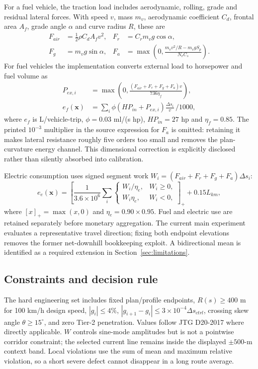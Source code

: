 \documentclass[preprint,12pt]{elsarticle}
\begin{document}
For a fuel vehicle, the traction load includes aerodynamic, rolling, grade and residual lateral forces. With speed $v$, mass $m_v$, aerodynamic coefficient $C_d$, frontal area $A_f$, grade angle $\alpha$ and curve radius $R$, these are
\begin{align}
F_{air}&=\tfrac12\rho C_d A_fv^2, & F_r&=C_rm_vg\cos\alpha,\\
F_g&=m_vg\sin\alpha, &
F_a&=\max\left(0,\frac{m_vv^2/R-m_vgS_p}{N_vC_s}\right).
\end{align}
For fuel vehicles the implementation converts external load to horsepower and fuel volume as
\begin{align}
P_{ex,i}&=\max\left(0,\frac{(F_{air}+F_r+F_g+F_a)v}{736\eta_f}\right),\\
e_f(\bm x)&=\sum_i \phi(HP_{in}+P_{ex,i})\frac{\Delta s_i}{v}\,/1000,
\label{eq:fuel}
\end{align}
where $e_f$ is L/vehicle-trip, $\phi=0.03$ ml/(s hp), $HP_{in}=27$ hp and $\eta_f=0.85$. The printed $10^{-3}$ multiplier in the source expression for $F_a$ is omitted: retaining it makes lateral resistance roughly five orders too small and removes the plan-curvature energy channel. This dimensional correction is explicitly disclosed rather than silently absorbed into calibration.

Electric consumption uses signed segment work $W_i=(F_{air}+F_r+F_g+F_a)\Delta s_i$:
\begin{equation}
e_e(\bm x)=\left[\frac{1}{3.6\times10^6}\sum_i
\begin{cases}W_i/\eta_e,&W_i\geq0,\\W_i\eta_e,&W_i<0,\end{cases}
\right]_+ +0.15L_{km},
\label{eq:ev}
\end{equation}
where $[x]_+=\max(x,0)$ and $\eta_e=0.90\times0.95$. Fuel and electric use are retained separately before monetary aggregation. The current main experiment evaluates a representative travel direction; fixing both endpoint elevations removes the former net-downhill bookkeeping exploit. A bidirectional mean is identified as a required extension in Section~\ref{sec:limitations}.

\subsection{Constraints and decision rule}

The hard engineering set includes fixed plan/profile endpoints, $R(s)\geq400$ m for 100 km/h design speed, $|g_i|\leq4\%$, $|g_{i+1}-g_i|\leq3\times10^{-4}\Delta s_{ctrl}$, crossing skew angle $\theta\geq15^\circ$, and zero Tier-2 penetration. Values follow JTG D20-2017 \cite{jtgd20} where directly applicable. $W$ controls sine-mode amplitudes but is not a pointwise corridor constraint; the selected current line remains inside the displayed $\pm500$-m context band. Local violations use the sum of mean and maximum relative violation, so a short severe defect cannot disappear in a long route average.
\end{document}
